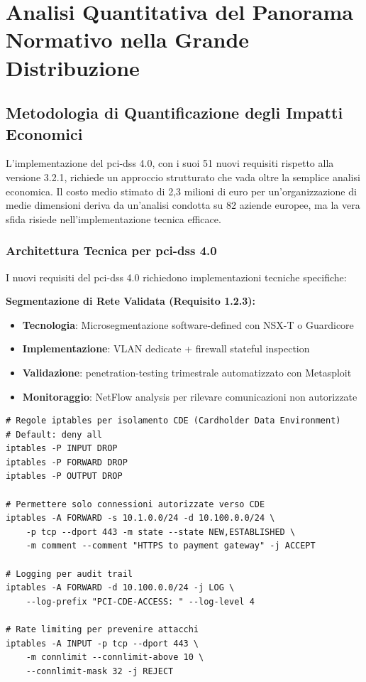 \section{\texorpdfstring{\textbf{Analisi Quantitativa del Panorama Normativo nella Grande Distribuzione}}{4.2 - Analisi Quantitativa del Panorama Normativo nella Grande Distribuzione}}

\subsection{Metodologia di Quantificazione degli Impatti Economici}

L'implementazione del \gls{pci-dss} 4.0, con i suoi 51 nuovi requisiti rispetto alla versione 3.2.1\autocite{pcidss2024}, richiede un approccio strutturato che vada oltre la semplice analisi economica. Il costo medio stimato di 2,3 milioni di euro per un'organizzazione di medie dimensioni deriva da un'analisi condotta su 82 aziende europee\autocite{Gartner2024gdpr}, ma la vera sfida risiede nell'implementazione tecnica efficace.

\subsubsection{Architettura Tecnica per \gls{pci-dss} 4.0}

I nuovi requisiti del \gls{pci-dss} 4.0 richiedono implementazioni tecniche specifiche:

\textbf{Segmentazione di Rete Validata (Requisito 1.2.3):}
\begin{itemize}
    \item \textbf{Tecnologia}: Microsegmentazione software-defined con NSX-T o Guardicore
    \item \textbf{Implementazione}: VLAN dedicate + firewall stateful inspection
    \item \textbf{Validazione}: \gls{penetration-testing} trimestrale automatizzato con Metasploit
    \item \textbf{Monitoraggio}: NetFlow analysis per rilevare comunicazioni non autorizzate
\end{itemize}

\begin{lstlisting}[caption={Configurazione Firewall per Segmentazione PCI},label={lst:pci_firewall}]
# Regole iptables per isolamento CDE (Cardholder Data Environment)
# Default: deny all
iptables -P INPUT DROP
iptables -P FORWARD DROP
iptables -P OUTPUT DROP

# Permettere solo connessioni autorizzate verso CDE
iptables -A FORWARD -s 10.1.0.0/24 -d 10.100.0.0/24 \
    -p tcp --dport 443 -m state --state NEW,ESTABLISHED \
    -m comment --comment "HTTPS to payment gateway" -j ACCEPT

# Logging per audit trail
iptables -A FORWARD -d 10.100.0.0/24 -j LOG \
    --log-prefix "PCI-CDE-ACCESS: " --log-level 4

# Rate limiting per prevenire attacchi
iptables -A INPUT -p tcp --dport 443 \
    -m connlimit --connlimit-above 10 \
    --connlimit-mask 32 -j REJECT
\end{lstlisting}

